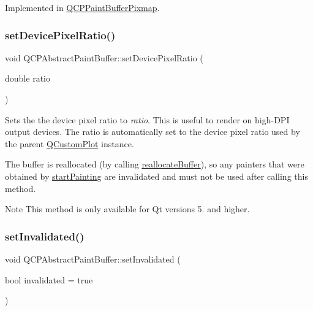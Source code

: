 Implemented in \mbox{\hyperlink{class_q_c_p_paint_buffer_pixmap_ad49f3205ba3463b1c44f8db3cfcc90f0}{Q\+C\+P\+Paint\+Buffer\+Pixmap}}.

\mbox{\label{class_q_c_p_abstract_paint_buffer_a555eaad5d5c806420ff35602a1bb68fa}} 
\subsubsection{\texorpdfstring{set\+Device\+Pixel\+Ratio()}{setDevicePixelRatio()}}
{\footnotesize\ttfamily void Q\+C\+P\+Abstract\+Paint\+Buffer\+::set\+Device\+Pixel\+Ratio (\begin{DoxyParamCaption}\item[{double}]{ratio }\end{DoxyParamCaption})}

Sets the the device pixel ratio to {\itshape ratio}. This is useful to render on high-\/\+D\+PI output devices. The ratio is automatically set to the device pixel ratio used by the parent \mbox{\hyperlink{class_q_custom_plot}{Q\+Custom\+Plot}} instance.

The buffer is reallocated (by calling \mbox{\hyperlink{class_q_c_p_abstract_paint_buffer_aee7506a52bd7e5a07c2af27935eb13e7}{reallocate\+Buffer}}), so any painters that were obtained by \mbox{\hyperlink{class_q_c_p_abstract_paint_buffer_a9e9f29b19c033cf02fb96f1a148463f3}{start\+Painting}} are invalidated and must not be used after calling this method.

\begin{DoxyNote}{Note}
This method is only available for Qt versions 5. and higher. 
\end{DoxyNote}
\mbox{\label{class_q_c_p_abstract_paint_buffer_ae4c7dc70dfc66be2879ce297b2b3d67f}} 
\subsubsection{\texorpdfstring{set\+Invalidated()}{setInvalidated()}}
{\footnotesize\ttfamily void Q\+C\+P\+Abstract\+Paint\+Buffer\+::set\+Invalidated (\begin{DoxyParamCaption}\item[{bool}]{invalidated = {\ttfamily true} }\end{DoxyParamCaption})}

